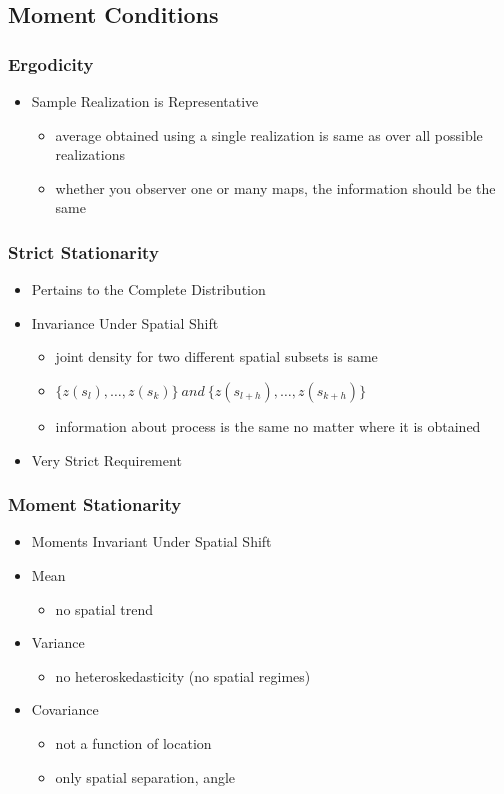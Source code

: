 \documentclass[nototal,handout]{beamer}
\begin{document}
  \subsection{Moment Conditions}
  \begin{frame}
    \frametitle{Ergodicity}
    \begin{itemize}
      \item Sample Realization is Representative
	\begin{itemize}
	  \item average obtained using a single realization is same as over
	    all possible realizations
	  \item whether you observer one or many maps, the information should
	    be the same
	\end{itemize}
    \end{itemize}
   \end{frame}

   \begin{frame}
     \frametitle{Strict Stationarity}
     \begin{itemize}
       \item Pertains to the Complete Distribution
	\item Invariance Under Spatial Shift
	  \begin{itemize}
	    \item joint density for two different spatial subsets is same
	    \item $\{ z(s_l),\ldots,z(s_k)\}\ and\  \{
	      z(s_{l+h}),\ldots,z(s_{k+h})\}$
	    \item information about process is the same no matter where it is
	      obtained
	  \end{itemize}
	\item Very Strict Requirement
     \end{itemize}
    \end{frame}



   \begin{frame}
     \frametitle{Moment Stationarity}
     \begin{itemize}
       \item Moments Invariant Under Spatial Shift
	\item Mean
	  \begin{itemize}
	    \item no spatial trend
	  \end{itemize}
	\item Variance
	  \begin{itemize}
	    \item no heteroskedasticity (no spatial regimes)
	  \end{itemize}
	\item Covariance
	  \begin{itemize}
	    \item not a function of location
	    \item only spatial separation, angle
	  \end{itemize}
     \end{itemize}
    \end{frame}
\end{document}

